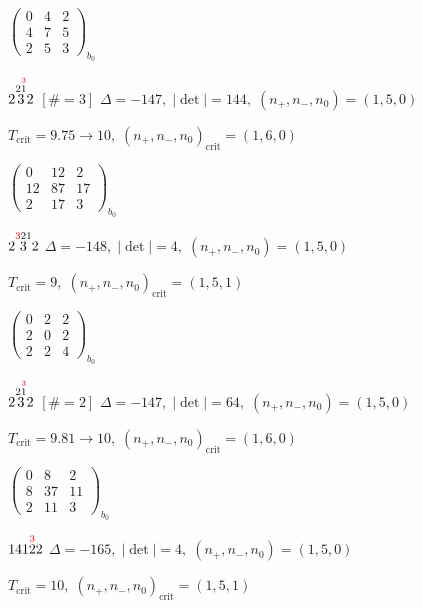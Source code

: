 \documentclass[10pt]{article}
\begin{document}
\hspace{2em}$\left(\begin{smallmatrix}0 & 4 & 2 \\ 4 & 7 & 5 \\ 2 & 5 & 3\end{smallmatrix}\right)_{\!b_0}$

$2\overset{2\overset{\textcolor{red}{3}}{1}}{3}2$ $\scriptstyle [\#=3]$ \quad $\Delta=-147,\; |\det|=144,\; (n_+,n_-,n_0)=(1,5,0)$

\hspace{1em}$T_{\text{crit}}=9.75 \to 10,\; (n_+,n_-,n_0)_{\text{crit}}=(1,6,0)$

\hspace{2em}$\left(\begin{smallmatrix}0 & 12 & 2 \\ 12 & 87 & 17 \\ 2 & 17 & 3\end{smallmatrix}\right)_{\!b_0}$

$2\overset{\textcolor{red}{3}21}{3}2$ \quad $\Delta=-148,\; |\det|=4,\; (n_+,n_-,n_0)=(1,5,0)$

\hspace{1em}$T_{\text{crit}}=9,\; (n_+,n_-,n_0)_{\text{crit}}=(1,5,1)$

\hspace{2em}$\left(\begin{smallmatrix}0 & 2 & 2 \\ 2 & 0 & 2 \\ 2 & 2 & 4\end{smallmatrix}\right)_{\!b_0}$

$2\overset{2\overset{\textcolor{red}{3}}{1}}{3}2$ $\scriptstyle [\#=2]$ \quad $\Delta=-147,\; |\det|=64,\; (n_+,n_-,n_0)=(1,5,0)$

\hspace{1em}$T_{\text{crit}}=9.81 \to 10,\; (n_+,n_-,n_0)_{\text{crit}}=(1,6,0)$

\hspace{2em}$\left(\begin{smallmatrix}0 & 8 & 2 \\ 8 & 37 & 11 \\ 2 & 11 & 3\end{smallmatrix}\right)_{\!b_0}$

\smallskip

$141\overset{\textcolor{red}{3}}{2}2$ \quad $\Delta=-165,\; |\det|=4,\; (n_+,n_-,n_0)=(1,5,0)$

\hspace{1em}$T_{\text{crit}}=10,\; (n_+,n_-,n_0)_{\text{crit}}=(1,5,1)$
\end{document}
